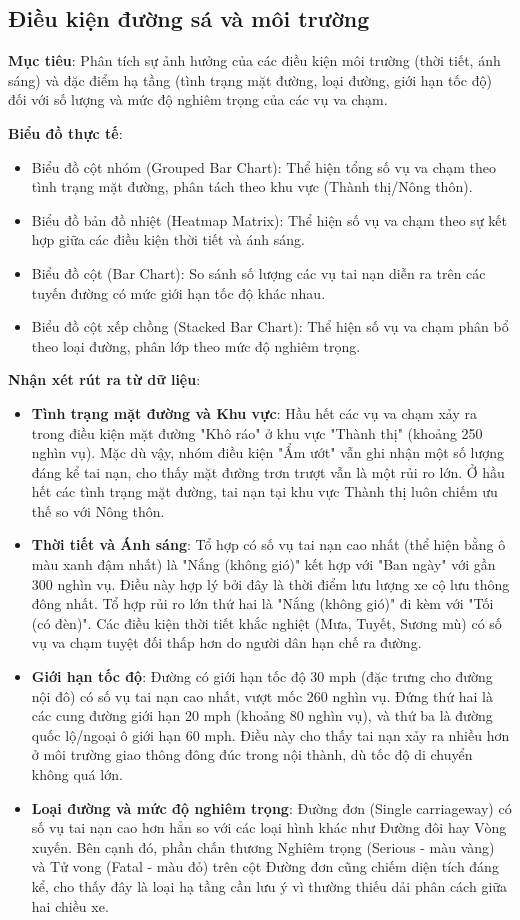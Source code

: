 \subsection{Điều kiện đường sá và môi trường}


\textbf{Mục tiêu}: Phân tích sự ảnh hưởng của các điều kiện môi trường (thời tiết, ánh sáng) và đặc điểm hạ tầng (tình trạng mặt đường, loại đường, giới hạn tốc độ) đối với số lượng và mức độ nghiêm trọng của các vụ va chạm.

\textbf{Biểu đồ thực tế}:
\begin{itemize}
    \item Biểu đồ cột nhóm (Grouped Bar Chart): Thể hiện tổng số vụ va chạm theo tình trạng mặt đường, phân tách theo khu vực (Thành thị/Nông thôn).
    \item Biểu đồ bản đồ nhiệt (Heatmap Matrix): Thể hiện số vụ va chạm theo sự kết hợp giữa các điều kiện thời tiết và ánh sáng.
    \item Biểu đồ cột (Bar Chart): So sánh số lượng các vụ tai nạn diễn ra trên các tuyến đường có mức giới hạn tốc độ khác nhau.
    \item Biểu đồ cột xếp chồng (Stacked Bar Chart): Thể hiện số vụ va chạm phân bổ theo loại đường, phân lớp theo mức độ nghiêm trọng.
\end{itemize}

\textbf{Nhận xét rút ra từ dữ liệu}:
\begin{itemize}
    \item \textbf{Tình trạng mặt đường và Khu vực}: Hầu hết các vụ va chạm xảy ra trong điều kiện mặt đường "Khô ráo" ở khu vực "Thành thị" (khoảng 250 nghìn vụ). Mặc dù vậy, nhóm điều kiện "Ẩm ướt" vẫn ghi nhận một số lượng đáng kể tai nạn, cho thấy mặt đường trơn trượt vẫn là một rủi ro lớn. Ở hầu hết các tình trạng mặt đường, tai nạn tại khu vực Thành thị luôn chiếm ưu thế so với Nông thôn.
    \item \textbf{Thời tiết và Ánh sáng}: Tổ hợp có số vụ tai nạn cao nhất (thể hiện bằng ô màu xanh đậm nhất) là "Nắng (không gió)" kết hợp với "Ban ngày" với gần 300 nghìn vụ. Điều này hợp lý bởi đây là thời điểm lưu lượng xe cộ lưu thông đông nhất. Tổ hợp rủi ro lớn thứ hai là "Nắng (không gió)" đi kèm với "Tối (có đèn)". Các điều kiện thời tiết khắc nghiệt (Mưa, Tuyết, Sương mù) có số vụ va chạm tuyệt đối thấp hơn do người dân hạn chế ra đường.
    \item \textbf{Giới hạn tốc độ}: Đường có giới hạn tốc độ 30 mph (đặc trưng cho đường nội đô) có số vụ tai nạn cao nhất, vượt mốc 260 nghìn vụ. Đứng thứ hai là các cung đường giới hạn 20 mph (khoảng 80 nghìn vụ), và thứ ba là đường quốc lộ/ngoại ô giới hạn 60 mph. Điều này cho thấy tai nạn xảy ra nhiều hơn ở môi trường giao thông đông đúc trong nội thành, dù tốc độ di chuyển không quá lớn.
    \item \textbf{Loại đường và mức độ nghiêm trọng}: Đường đơn (Single carriageway) có số vụ tai nạn cao hơn hẳn so với các loại hình khác như Đường đôi hay Vòng xuyến. Bên cạnh đó, phần chấn thương Nghiêm trọng (Serious - màu vàng) và Tử vong (Fatal - màu đỏ) trên cột Đường đơn cũng chiếm diện tích đáng kể, cho thấy đây là loại hạ tầng cần lưu ý vì thường thiếu dải phân cách giữa hai chiều xe.
\end{itemize}

